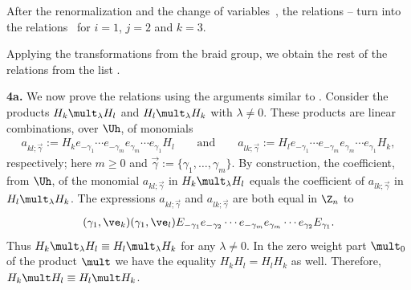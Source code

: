 \documentclass[11pt]{article}
\numberwithin{equation}{section}
\begin{document}
After the renormalization  and the change of variables~, the relations -- turn into
the relations~ for $i=1$, $j=2$ and $k=3$.


Applying the transformations from the braid group, we obtain the rest of the relations from the list .

{\bf 4a.} We now prove the relations  using the arguments similar to \cite[Subsection 6.1.2]{Zh}.
 Consider the
products $H_k\mult_\lambda H_l$  and $H_l\mult_\lambda H_k$ with $\lambda\not=0$.
These products are linear combinations, over $\Uh$, of monomials
\begin{gather*}
a_{kl;\vec{\gamma}}:=H_ke_{-\gamma_1}\cdots e_{-\gamma_m}e_{\gamma_m}\cdots e_{\gamma_1}H_l\qquad\text{and}\qquad
a_{lk;\vec{\gamma}}:=H_le_{-\gamma_1}\cdots e_{-\gamma_m}e_{\gamma_m}\cdots e_{\gamma_1}H_k  ,
\end{gather*}
respectively; here $m\geq 0$ and $\vec{\gamma}:=\{\gamma_1,\dots ,\gamma_m\}$. By construction, the coef\/f\/icient, from $\Uh$, of the monomial
$a_{kl;\vec{\gamma}}$ in $H_k\mult_\lambda H_l$ equals the coef\/f\/icient of $a_{lk;\vec{\gamma}}$ in $H_l\mult_\lambda H_k$.
The expressions $a_{kl;\vec{\gamma}}$ and $a_{lk;\vec{\gamma}}$ are both equal in $\Z_n$  to
\begin{gather*}(\gamma_1,\ve_k)(\gamma_1,\ve_l)E_{-\gamma_1}e_{-\gamma_2}\cdots
e_{-\gamma_m}e_{\gamma_m}\cdots e_{\gamma_2}E_{\gamma_1}  .\end{gather*}
Thus $H_k\mult_\lambda H_l\equiv H_l\mult_\lambda H_k$  for any $\lambda\not=0$. In the zero weight part $\mult_0$
of the product $\mult$ we have the equality $H_kH_l=H_lH_k$ as well. Therefore,
$H_k\mult H_l\equiv H_l\mult H_k$.
\end{document}
